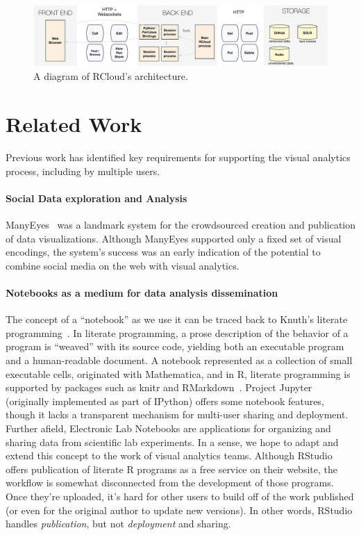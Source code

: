 \begin{figure}
\centering
\includegraphics[width=.9\linewidth]{fig/system/system.pdf}
\caption{\label{fig:system}A diagram of RCloud's architecture. }
\end{figure}

\section{Related Work\label{sec:related}}

Previous work has identified key requirements for supporting the
visual analytics process, including by multiple users.

\paragraph*{Social Data exploration and Analysis}
ManyEyes~\cite{Viegas:2007:MAS} was a landmark system for the
crowdsourced creation and publication of data visualizations.
Although ManyEyes supported only a fixed set of visual encodings,
the system's success was an early indication of the potential to
combine social media on the web with visual analytics.

\paragraph*{Notebooks as a medium for data analysis dissemination}
The concept of a ``notebook'' as we use it can be traced
back to Knuth's literate programming~\cite{Knuth:1984:LP}. In
literate programming, a prose description of the behavior of
a program is ``weaved'' with its source code, yielding both an
executable program and a human-readable document.
A notebook represented as a collection of small executable cells,
originated with Mathematica, and in R, literate programming is
supported by packages such as knitr and RMarkdown~\cite{Xie:2013:DDW}.
Project Jupyter~\cite{jupyter} (originally implemented as part of
IPython) offers some notebook features, though it lacks a transparent
mechanism for multi-user sharing and deployment.
%
Further afield, {Electronic Lab Notebooks} are applications for organizing
and sharing data from scientific lab experiments\cite{Rubacha:2011:ELN}.
In a sense, we hope to adapt and extend this concept to the work of
visual analytics teams.
%
Although RStudio offers publication of literate R programs as a free
service on their website, the workflow is somewhat disconnected from
the development of those programs. Once they're uploaded, it's hard
for other users to build off of the work published (or even for the
original author to update new versions). In other words, RStudio
handles \emph{publication}, but not \emph{deployment} and sharing.

